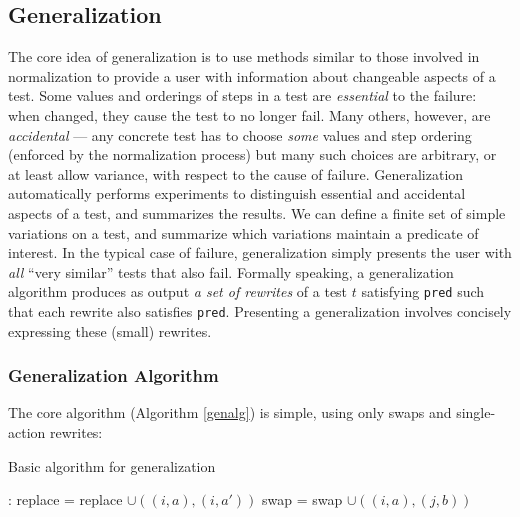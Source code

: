 



\subsection{Generalization}



The core idea of generalization is to use methods similar to those
involved in normalization to provide a user with information about
changeable aspects of a test.  Some values and orderings of steps
in a test are \emph{essential} to the failure: when changed, they
cause the test to no longer fail.  Many others, however, are
\emph{accidental} --- any concrete test has to choose \emph{some}
values and step ordering (enforced by the normalization
process) but many such choices are arbitrary, or at least allow
variance, with respect to the cause of failure.  Generalization
automatically performs experiments to distinguish essential and accidental aspects
of a test, and summarizes the results.  We
can define a finite set of simple variations on a test, and summarize which
variations maintain a predicate of interest. In the typical case of
failure, generalization simply presents the user with \emph{all}
``very similar'' tests that also fail. Formally
speaking, a generalization algorithm produces as output \emph{a set of
  rewrites} of a test $t$ satisfying {\tt pred} such that each rewrite
also satisfies {\tt pred}.  Presenting a generalization involves
concisely expressing these (small) rewrites.

\subsubsection{Generalization Algorithm}

The core algorithm
(Algorithm \ref{genalg}) is simple, using only swaps and single-action
rewrites:

\begin{algorithm}
\caption{Basic algorithm for generalization}
\label{genalg}
{%
\begin{algorithmic}[1]
:
\State replace = replace $\cup ((i,a),(i,a'))$
\EndIf
\EndFor 
{}
\State swap = swap $\cup ((i,a),(j,b))$
\EndIf
\EndFor
\EndFor
{}
\end{algorithmic}
}
\end{algorithm}

